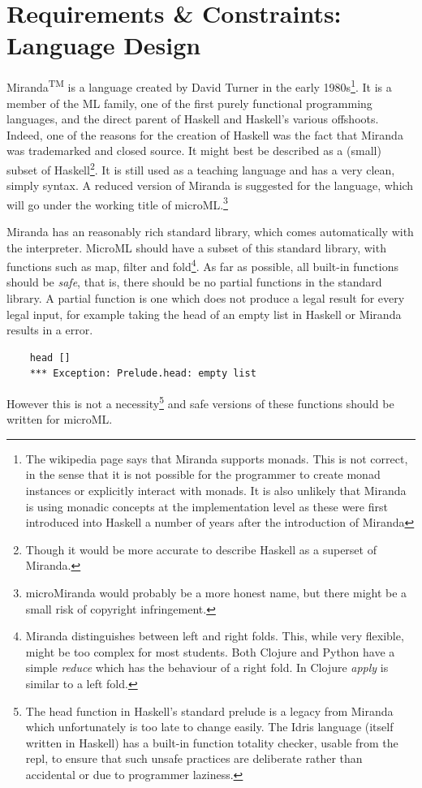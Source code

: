 \documentclass[12pt, a4paper]{report}
\begin{document}
\section{Requirements \& Constraints: Language Design}
Miranda\textsuperscript{TM} is a language created by David Turner in the early 1980s\footnote{The wikipedia 
    page says that Miranda supports monads. This is not correct, in
    the sense that it is not possible for the programmer to create monad instances or explicitly
    interact with monads. It is also
unlikely that Miranda is using monadic concepts at the implementation level as these were first
introduced into Haskell a number of years after the introduction of Miranda}. It is a member
of the ML family, one of the first purely functional programming languages, and the direct parent of
Haskell and Haskell's various offshoots. Indeed, one of the reasons for the creation of Haskell was
the fact that Miranda was trademarked and closed source. It might best be described as a (small)
subset of Haskell\footnote{Though it would be more accurate to describe Haskell as a superset of
    Miranda.}. It is still used as a teaching language and has a very clean, simply syntax. A
reduced version of Miranda is suggested for the language, which will go under the working title of
microML.\footnote{microMiranda would probably be a more honest name, but there might be a small
    risk of copyright infringement.}

Miranda has an reasonably rich standard library, which comes automatically with the interpreter. MicroML
should have a subset of this standard library, with functions such as map, filter and fold\footnote{Miranda 
    distinguishes between left and right folds. This, while very flexible, might be
too complex for most students. Both Clojure and Python have a simple \textit{reduce} which has the
behaviour of a right fold. In Clojure \textit{apply} is similar to a left fold.}. As far as possible, 
all built-in functions should be \textit{safe}, that is, there should be no
partial functions in the standard library. A partial function is one which does not produce a legal
result for every legal input, for example taking the head of an empty list in Haskell or Miranda
results in a error.

\begin{verbatim}
    head []
    *** Exception: Prelude.head: empty list
\end{verbatim} 

However this is not a necessity\footnote{The head function in Haskell's standard prelude is a legacy
    from Miranda which unfortunately is too late to change easily. The Idris language (itself
    written in Haskell) has a built-in function totality checker, usable from the repl, to ensure
that such unsafe practices are deliberate rather than accidental or due to programmer laziness.} 
and safe versions of these functions should be written for microML. 
\end{document}

